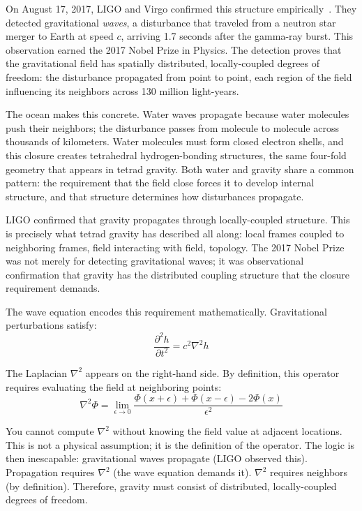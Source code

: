 \documentclass[aps,prd,preprint,superscriptaddress,showpacs,preprintnumbers,amsmath,amssymb,nofootinbib]{revtex4-2}
\begin{document}
On August 17, 2017, LIGO and Virgo confirmed this structure empirically~\cite{gw170817}. They detected gravitational \emph{waves}, a disturbance that traveled from a neutron star merger to Earth at speed $c$, arriving 1.7 seconds after the gamma-ray burst. This observation earned the 2017 Nobel Prize in Physics. The detection proves that the gravitational field has spatially distributed, locally-coupled degrees of freedom: the disturbance propagated from point to point, each region of the field influencing its neighbors across 130 million light-years.

The ocean makes this concrete. Water waves propagate because water molecules push their neighbors; the disturbance passes from molecule to molecule across thousands of kilometers. Water molecules must form closed electron shells, and this closure creates tetrahedral hydrogen-bonding structures, the same four-fold geometry that appears in tetrad gravity. Both water and gravity share a common pattern: the requirement that the field close forces it to develop internal structure, and that structure determines how disturbances propagate.

LIGO confirmed that gravity propagates through locally-coupled structure. This is precisely what tetrad gravity has described all along: local frames coupled to neighboring frames, field interacting with field, topology. The 2017 Nobel Prize was not merely for detecting gravitational waves; it was observational confirmation that gravity has the distributed coupling structure that the closure requirement demands.

The wave equation encodes this requirement mathematically. Gravitational perturbations satisfy:
\begin{equation}
\frac{\partial^2 h}{\partial t^2} = c^2 \nabla^2 h
\label{eq:wave}
\end{equation}

The Laplacian $\nabla^2$ appears on the right-hand side. By definition, this operator requires evaluating the field at neighboring points:
\begin{equation}
\nabla^2 \Phi = \lim_{\epsilon \to 0} \frac{\Phi(x+\epsilon) + \Phi(x-\epsilon) - 2\Phi(x)}{\epsilon^2}
\label{eq:laplacian}
\end{equation}

You cannot compute $\nabla^2$ without knowing the field value at adjacent locations. This is not a physical assumption; it is the definition of the operator. The logic is then inescapable: gravitational waves propagate (LIGO observed this). Propagation requires $\nabla^2$ (the wave equation demands it). $\nabla^2$ requires neighbors (by definition). Therefore, gravity must consist of distributed, locally-coupled degrees of freedom.
\end{document}
